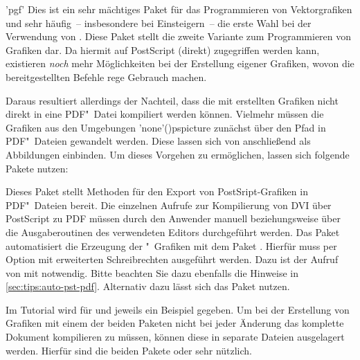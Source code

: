 \begin{DeclarePackages}[Grafiken|?]
'pgf'
  Dies ist ein sehr mächtiges Paket für das Programmieren von Vektorgrafiken 
  und sehr häufig~-- insbesondere bei Einsteigern~-- die erste Wahl bei der 
  Verwendung von .
  Diese Paket stellt die zweite Variante zum Programmieren von Grafiken dar. 
  Da hiermit auf PostScript (direkt) zugegriffen werden kann, existieren 
  \emph{noch} mehr Möglichkeiten bei der Erstellung eigener Grafiken, wovon
  die bereitgestellten Befehle rege Gebrauch machen. 
  
  Daraus resultiert allerdings der Nachteil, dass die mit  
  erstellten Grafiken nicht direkt in eine PDF"~Datei kompiliert werden können. 
  Vielmehr müssen die Grafiken aus den Umgebungen 
  \Environment'none'(){pspicture} zunächst über den Pfad 
   in PDF"~Dateien gewandelt werden. Diese 
  lassen sich von  anschließend als Abbildungen einbinden. Um 
  dieses Vorgehen zu ermöglichen, lassen sich folgende Pakete nutzen:
  \begin{DeclarePackages}
    Dieses Paket stellt Methoden für den Export von PostSript-Grafiken in 
    PDF"~Dateien bereit. Die einzelnen Aufrufe zur Kompilierung von DVI über 
    PostScript zu PDF müssen durch den Anwender manuell beziehungsweise über 
    die Ausgaberoutinen des verwendeten Editors durchgeführt werden.
    Das Paket automatisiert die Erzeugung der "~Grafiken mit 
    dem Paket . Hierfür muss  per Option mit 
    erweiterten Schreibrechten ausgeführt werden. Dazu ist der Aufruf von 
     mit  notwendig. Bitte beachten Sie 
    dazu ebenfalls die Hinweise in \autoref{sec:tips:auto-pst-pdf}. Alternativ
    dazu lässt sich das Paket  nutzen.
  \end{DeclarePackages}
\end{DeclarePackages}

Im Tutorial  wird für  und 
 jeweils ein Beispiel gegeben. Um bei der Erstellung von Grafiken 
mit einem der beiden Paketen nicht bei jeder Änderung das komplette Dokument 
kompilieren zu müssen, können diese in separate Dateien ausgelagert werden. 
Hierfür sind die beiden Pakete  oder  
sehr nützlich.

